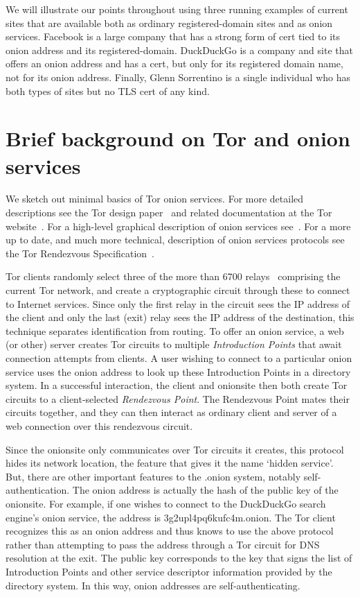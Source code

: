 \documentclass[10pt, conference, compsocconf]{styles/IEEEtran}
\begin{document}
We will illustrate our points throughout using three running examples
of current sites that are available both as ordinary registered-domain
sites and as onion services. Facebook is a large company that has a
strong form of cert tied to its onion address and its
registered-domain. DuckDuckGo is a company and site that offers an
onion address and has a cert, but only for its registered domain name,
not for its onion address.  Finally, Glenn Sorrentino is a single
individual who has both types of sites but no TLS cert of any kind.

\section{Brief background on Tor and onion services}

We sketch out minimal basics of Tor onion services. For more detailed
descriptions see the Tor design paper~\cite{tor-design} and related documentation at the
Tor website~\cite{torproject}. For a high-level graphical description
of onion services see~\cite{tor-hs}. For a more up to date, and much
more technical, description of onion services protocols see the Tor
Rendezvous Specification~\cite{tor-rend-spec}.

Tor clients randomly select three of the more than 6700 relays~\cite{tor-network-size}
comprising the current Tor network, and create a cryptographic circuit
through these to connect to Internet services. Since only the first
relay in the circuit sees the IP address of the client and
only the last (exit) relay sees the IP address of the destination,
this technique separates identification from routing.
To offer an onion service, a web (or other) server creates Tor circuits to
multiple \emph{Introduction Points} that await connection attempts
from clients. A user wishing to connect to a particular onion service
uses the onion address to look up these Introduction Points in a
directory system. In a successful interaction, the client and
onionsite then both create Tor circuits to a client-selected
\emph{Rendezvous Point}. The Rendezvous Point mates their circuits
together, and they can then interact as ordinary client and server of
a web connection over this rendezvous circuit.

Since the onionsite only communicates over Tor circuits it creates,
this protocol hides its network location, the feature that
gives it the name `hidden service'. But, there are other important
features to the .onion system, notably self-authentication. The onion
address is actually the hash of the public key of the onionsite. For
example, if one wishes to connect to the DuckDuckGo search engine's
onion service, the address is 3g2upl4pq6kufc4m.onion. The Tor client
recognizes this as an onion address and thus knows to use the above
protocol rather than attempting to pass the address through a Tor
circuit for DNS resolution at the exit. The public key
corresponds to the key that signs the list of Introduction Points
and other service descriptor information provided by the directory
system. In this way, onion addresses are self-authenticating.
\end{document}
